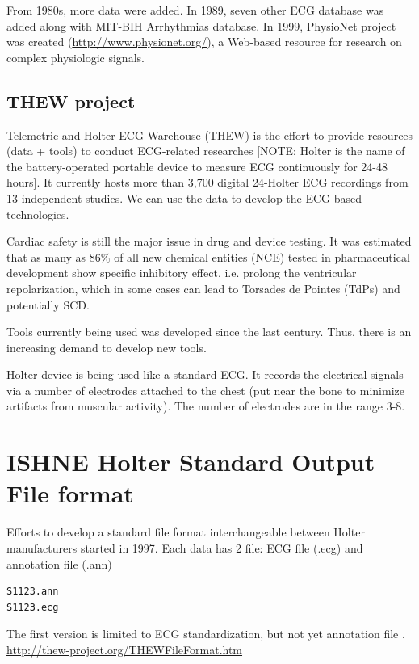 From 1980s, more data were added. In 1989, seven other ECG database was added
along with MIT-BIH Arrhythmias database. In 1999, PhysioNet project was created
(\url{http://www.physionet.org/}), a Web-based resource for research on complex
physiologic signals.


\subsection{THEW project}
\label{sec:THEW}

Telemetric and Holter ECG Warehouse (THEW) is the effort to provide resources
(data + tools) to conduct ECG-related researches [NOTE: Holter is the name of
the battery-operated portable device to measure ECG continuously for 24-48
hours]. It currently hosts more than 3,700 digital 24-Holter ECG recordings from
13 independent studies. We can use the data to develop the ECG-based
technologies.

\begin{framed}
Cardiac safety is still the major issue in drug and device testing. It was
estimated that as many as 86\% of all new chemical entities (NCE) tested in
pharmaceutical development show specific inhibitory effect, i.e. prolong the
ventricular repolarization, which in some cases can lead to Torsades de Pointes
(TdPs) and potentially SCD.

Tools currently being used was developed since the last century. Thus, there is
an increasing demand to develop new tools.

Holter device is being used like a standard ECG. It records the electrical
signals via a number of electrodes attached to the chest (put near the bone to
minimize artifacts from muscular activity). The number of electrodes are in the
range 3-8.
\end{framed}


\section{ISHNE Holter Standard Output File format}
\label{sec:ISHNE_Holter-FileFormat}


Efforts to develop a standard file format interchangeable between
Holter manufacturers started in 1997. Each data has 2 file: ECG file (.ecg) and
annotation file (.ann)
\begin{verbatim}
S1123.ann
S1123.ecg
\end{verbatim}
The first version is limited to ECG standardization, but not yet annotation
file \citep{zareba1998}. \url{http://thew-project.org/THEWFileFormat.htm}

